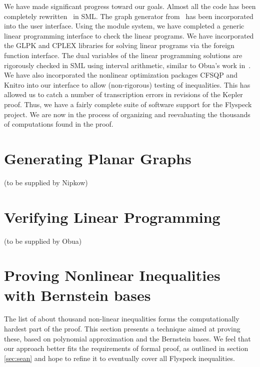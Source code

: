 \documentclass[11pt]{amsart}
\begin{document}
We have made significant progress toward our goals. Almost all the
code has been completely rewritten~\cite{McLaughlin:2008:KeplerCode} in
SML. The graph generator
from~\cite{Nipkow:2005:Tame} has been incorporated into the user
interface. Using the module system, we have completed a generic linear
programming interface to check the linear programs. We have
incorporated the GLPK and CPLEX libraries for solving linear programs
via the foreign function interface. The dual variables of the linear
programming solutions are rigorously checked in SML using interval
arithmetic, similar to Obua's work in~\cite{Obua:2005:Thesis}. We have
also incorporated the nonlinear optimization packages CFSQP and Knitro
into our interface to allow (non-rigorous) testing of inequalities.
This has allowed us to catch a number of transcription errors in
revisions of the Kepler proof. Thus, we have a fairly complete suite
of software support for the Flyspeck project. We are now in the
process of organizing and reevaluating the thousands of computations
found in the proof.


\section{Generating Planar Graphs}
\label{sec:graph}

(to be supplied by Nipkow)

\section{Verifying Linear Programming}
\label{sec:lp}

(to be supplied by Obua)

\section{Proving Nonlinear Inequalities with Bernstein bases}
\label{sec:zumkeller}

The list of about thousand non-linear inequalities forms the computationally
hardest part of the proof. This section presents a technique aimed at proving
these, based on polynomial approximation and the Bernstein bases. We feel that
our approach better fits the requirements of formal proof, as outlined in
section \ref{sec:sean} and hope to refine it to eventually cover all Flyspeck
inequalities.
\end{document}
